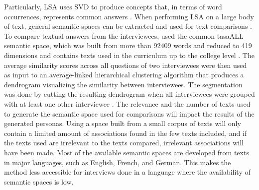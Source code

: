 Particularly, LSA uses SVD to produce concepts that, in terms of word occurrences, represents common answers \citep{Miaskiewicz2008}. When performing LSA on a large body of text, general semantic spaces can be extracted and used for text comparisons \citep{Landauer1998}. To compare textual answers from the interviewees, \cite{Miaskiewicz2008} used the common tasaALL semantic space, which was built from more than 92409 words and reduced to 419 dimensions and contains texts used in the curriculum up to the college level \citep{Landauer2007}. The average similarity scores across all questions of two interviewees were then used as input to an average-linked hierarchical clustering algorithm that produces a dendrogram visualizing the similarity between interviewees. The segmentation was done by cutting the resulting dendrogram when all interviewees were grouped with at least one other interviewee \citep{Miaskiewicz2008}. The relevance and the number of texts used to generate the semantic space used for comparisons will impact the results of the generated personas. Using a space built from a small corpus of texts will only contain a limited amount of associations found in the few texts included, and if the texts used are irrelevant to the texts compared, irrelevant associations will have been made. Most of the available semantic spaces are developed from texts in major languages, such as English, French, and German. This makes the method less accessible for interviews done in a language where the availability of semantic spaces is low.

